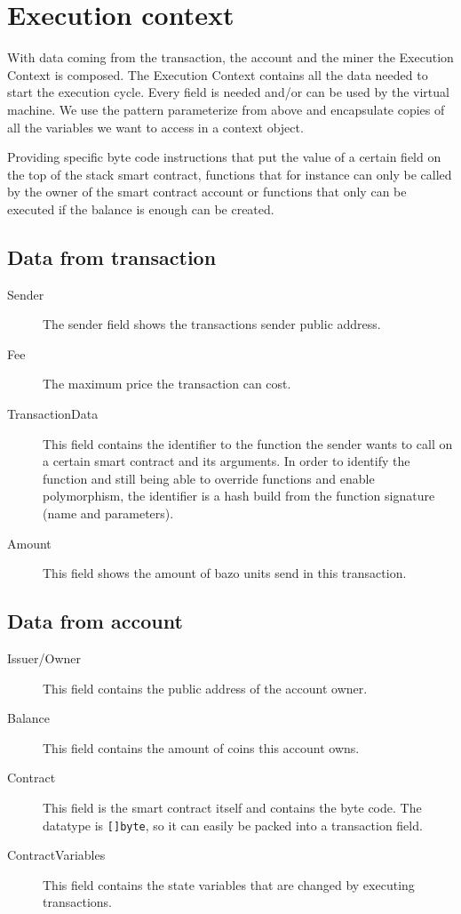 \section{Execution context}
With data coming from the transaction, the account and the miner the Execution Context is composed. The Execution Context contains all the data needed to start the execution cycle. Every field is needed and/or can be used by the virtual machine. We use the pattern parameterize from above and encapsulate copies of all the variables we want to access in a context object.

Providing specific byte code instructions that put the value of a certain field on the top of the stack smart contract, functions that for instance can only be called by the owner of the smart contract account or functions that only can be executed if the balance is enough can be created.

\subsection{Data from transaction}
\begin{description}
  \item[Sender] The sender field shows the transactions sender public address.
  \item[Fee] The maximum price the transaction can cost.
  \item[TransactionData] This field contains the identifier to the function the sender wants to call on a certain smart contract and its arguments. In order to identify the function and still being able to override functions and enable polymorphism, the identifier is a hash build from the function signature (name and parameters).
  \item[Amount] This field shows the amount of bazo units send in this transaction.
\end{description}

\subsection{Data from account}
\begin{description}
  \item[Issuer/Owner] This field contains the public address of the account owner.
  \item[Balance] This field contains the amount of coins this account owns.
  \item[Contract] This field is the smart contract itself and contains the byte code. The datatype is \texttt{[]byte}, so it can easily be packed into a transaction field.
  \item[ContractVariables] This field contains the state variables that are changed by executing transactions.
\end{description}


